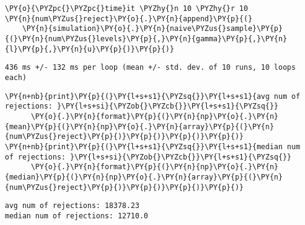 \documentclass[10pt, article,table]{article}
\begin{document}
\begin{tcolorbox}[breakable, size=fbox, boxrule=1pt, pad at break*=1mm,colback=cellbackground, colframe=cellborder]
\begin{Verbatim}[commandchars=\\\{\}]
\PY{o}{\PYZpc{}\PYZpc{}time}it \PYZhy{}n 10 \PYZhy{}r 10
\PY{n}{num\PYZus{}reject}\PY{o}{.}\PY{n}{append}\PY{p}{(}
    \PY{n}{simulation}\PY{o}{.}\PY{n}{naive\PYZus{}sample}\PY{p}{(}\PY{n}{num\PYZus{}levels}\PY{p}{,}\PY{n}{gamma}\PY{p}{,}\PY{n}{l}\PY{p}{,}\PY{n}{u}\PY{p}{)}\PY{p}{)}
\end{Verbatim}
\end{tcolorbox}
\begin{tcolorbox}[breakable, size=fbox, boxrule=.5pt, pad at break*=1mm, opacityfill=0]
\begin{Verbatim}[commandchars=\\\{\}]
436 ms +/- 132 ms per loop (mean +/- std. dev. of 10 runs, 10 loops each)
\end{Verbatim}
\end{tcolorbox}

\begin{tcolorbox}[breakable, size=fbox, boxrule=1pt, pad at break*=1mm,colback=cellbackground, colframe=cellborder]
\begin{Verbatim}[commandchars=\\\{\}]
\PY{n+nb}{print}\PY{p}{(}\PY{l+s+s1}{\PYZsq{}}\PY{l+s+s1}{avg num of rejections: }\PY{l+s+si}{\PYZob{}\PYZcb{}}\PY{l+s+s1}{\PYZsq{}}
      \PY{o}{.}\PY{n}{format}\PY{p}{(}\PY{n}{np}\PY{o}{.}\PY{n}{mean}\PY{p}{(}\PY{n}{np}\PY{o}{.}\PY{n}{array}\PY{p}{(}\PY{n}{num\PYZus{}reject}\PY{p}{)}\PY{p}{)}\PY{p}{)}\PY{p}{)}
\PY{n+nb}{print}\PY{p}{(}\PY{l+s+s1}{\PYZsq{}}\PY{l+s+s1}{median num of rejections: }\PY{l+s+si}{\PYZob{}\PYZcb{}}\PY{l+s+s1}{\PYZsq{}}
      \PY{o}{.}\PY{n}{format}\PY{p}{(}\PY{n}{np}\PY{o}{.}\PY{n}{median}\PY{p}{(}\PY{n}{np}\PY{o}{.}\PY{n}{array}\PY{p}{(}\PY{n}{num\PYZus{}reject}\PY{p}{)}\PY{p}{)}\PY{p}{)}\PY{p}{)}
\end{Verbatim}
\end{tcolorbox}
\begin{tcolorbox}[breakable, size=fbox, boxrule=.5pt, pad at break*=1mm, opacityfill=0]
\begin{Verbatim}[commandchars=\\\{\}]
avg num of rejections: 18378.23
median num of rejections: 12710.0
\end{Verbatim}
\end{tcolorbox}
\end{document}
